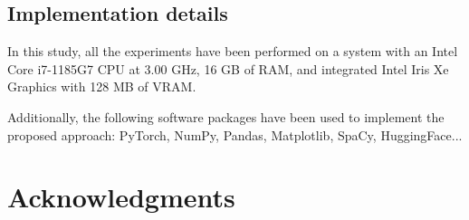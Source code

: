 \documentclass[a4paper,12pt, openany]{book}  %
\begin{document}
\frontmatter
\pagestyle{fancy}
\tableofcontents


\clearpage
\listoffigures
\clearpage
\listoftables

\newpage
\thispagestyle{empty} 
\mbox{}                

\mainmatter
\pagestyle{fancy}
\renewcommand{\figureautorefname}{Fig.}
\renewcommand{\tableautorefname}{Tab.}
\renewcommand{\chapterautorefname}{Chap.}
\renewcommand{\sectionautorefname}{Sec.}
\makeatletter
\renewcommand{\thefootnote}{\textsuperscript{\arabic{footnote}}}
\renewcommand\@makefntext[1]{%
  \noindent
  \parindent=0pt
  \leftskip=0pt
  \hb@xt@1.8em{\hss\@thefnmark}#1%
}
\makeatother










\clearpage
\begin{appendices}
    \chapter{Implementation details}
    \label{appendix:A}

In this study, all the experiments have been performed on a system with an Intel Core i7-1185G7 CPU at 3.00 GHz, 16 GB of RAM, and integrated Intel Iris Xe Graphics with 128 MB of VRAM. 

\noindent Additionally, the following software packages have been used to implement the proposed approach: PyTorch, NumPy, Pandas, Matplotlib, SpaCy, HuggingFace...




\end{appendices}


\chapter*{Acknowledgments}
\clearpage
\sloppy
\backmatter
\pagestyle{fancy}

{}
\printbibliography
\end{document}
